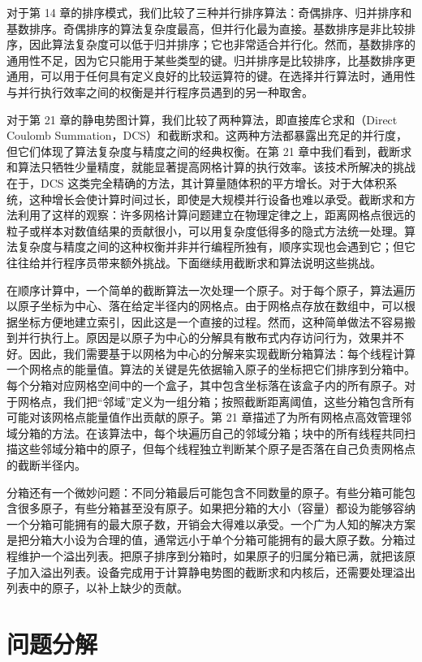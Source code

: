 对于第 14 章的排序模式，我们比较了三种并行排序算法：奇偶排序、归并排序和基数排序。奇偶排序的算法复杂度最高，但并行化最为直接。基数排序是非比较排序，因此算法复杂度可以低于归并排序；它也非常适合并行化。然而，基数排序的通用性不足，因为它只能用于某些类型的键。归并排序是比较排序，比基数排序更通用，可以用于任何具有定义良好的比较运算符的键。在选择并行算法时，通用性与并行执行效率之间的权衡是并行程序员遇到的另一种取舍。

对于第 21 章的静电势图计算，我们比较了两种算法，即直接库仑求和（Direct Coulomb Summation，DCS）和截断求和。这两种方法都暴露出充足的并行度，但它们体现了算法复杂度与精度之间的经典权衡。在第 21 章中我们看到，截断求和算法只牺牲少量精度，就能显著提高网格计算的执行效率。该技术所解决的挑战在于，DCS 这类完全精确的方法，其计算量随体积的平方增长。对于大体积系统，这种增长会使计算时间过长，即使是大规模并行设备也难以承受。截断求和方法利用了这样的观察：许多网格计算问题建立在物理定律之上，距离网格点很远的粒子或样本对数值结果的贡献很小，可以用复杂度低得多的隐式方法统一处理。算法复杂度与精度之间的这种权衡并非并行编程所独有，顺序实现也会遇到它；但它往往给并行程序员带来额外挑战。下面继续用截断求和算法说明这些挑战。

在顺序计算中，一个简单的截断算法一次处理一个原子。对于每个原子，算法遍历以原子坐标为中心、落在给定半径内的网格点。由于网格点存放在数组中，可以根据坐标方便地建立索引，因此这是一个直接的过程。然而，这种简单做法不容易搬到并行执行上。原因是以原子为中心的分解具有散布式内存访问行为，效果并不好。因此，我们需要基于以网格为中心的分解来实现截断分箱算法：每个线程计算一个网格点的能量值。算法的关键是先依据输入原子的坐标把它们排序到分箱中。每个分箱对应网格空间中的一个盒子，其中包含坐标落在该盒子内的所有原子。对于网格点，我们把“邻域”定义为一组分箱；按照截断距离阈值，这些分箱包含所有可能对该网格点能量值作出贡献的原子。第 21 章描述了为所有网格点高效管理邻域分箱的方法。在该算法中，每个块遍历自己的邻域分箱；块中的所有线程共同扫描这些邻域分箱中的原子，但每个线程独立判断某个原子是否落在自己负责网格点的截断半径内。

分箱还有一个微妙问题：不同分箱最后可能包含不同数量的原子。有些分箱可能包含很多原子，有些分箱甚至没有原子。如果把分箱的大小（容量）都设为能够容纳一个分箱可能拥有的最大原子数，开销会大得难以承受。一个广为人知的解决方案是把分箱大小设为合理的值，通常远小于单个分箱可能拥有的最大原子数。分箱过程维护一个溢出列表。把原子排序到分箱时，如果原子的归属分箱已满，就把该原子加入溢出列表。设备完成用于计算静电势图的截断求和内核后，还需要处理溢出列表中的原子，以补上缺少的贡献。

\section{问题分解}
\label{sec:problem-decomposition}

